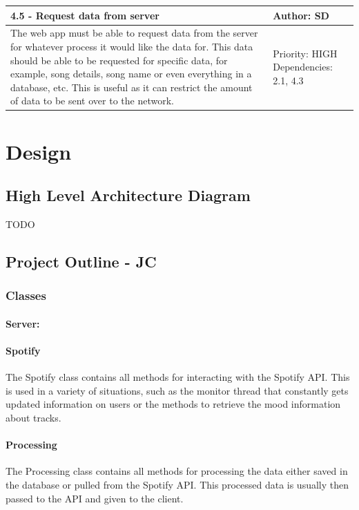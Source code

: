 \documentclass[11pt]{report}
\begin{document}
\begin{center}
\begin{longtable}{| p{13cm} | p{3cm} |}
\hline
\textbf{4.5 - Request data from server} & \textbf{Author: SD} \\
\hline
The web app must be able to request data from the server for whatever process it would like the data for. This data should be able to be requested for specific data, for example, song details, song name or even everything in a database, etc. This is useful as it can restrict the amount of data to be sent over to the network. & Priority: HIGH Dependencies: 2.1, 4.3 \\
\hline

\end{longtable}

\end{center}

\chapter{Design}

\section{High Level Architecture Diagram}

TODO

\section{Project Outline - JC}

\subsection{Classes}


\subsubsection{Server:}

\hrulefill

\subsubsection{Spotify}
The Spotify class contains all methods for interacting with the Spotify API. This is used in a variety of situations, such as the monitor thread that constantly gets updated information on users or the methods to retrieve the mood information about tracks. 

\subsubsection{Processing}
The Processing class contains all methods for processing the data either saved in the database or pulled from the Spotify API. This processed data is usually then passed to the API and given to the client.
\end{document}
